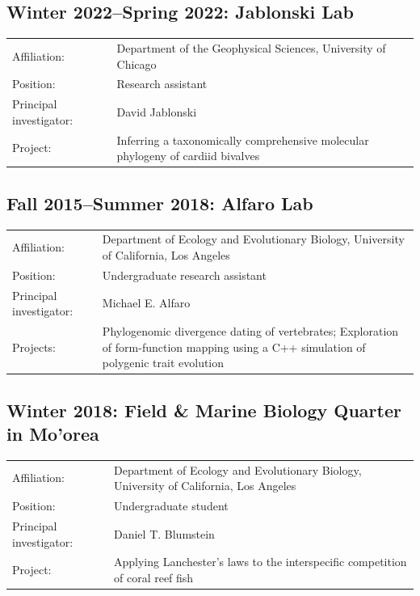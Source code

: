\documentclass[10pt]{article}
\begin{document}
\subsection*{Winter 2022--Spring 2022: Jablonski Lab}

\begin{tabularx}{\textwidth}{>{\raggedleft\arraybackslash}p{3.6cm} X}
Affiliation: & Department of the Geophysical Sciences, University of Chicago \\[0.1cm]
Position: & Research assistant \\[0.1cm]
Principal investigator: & David Jablonski \\[0.1cm]
Project: & Inferring a taxonomically comprehensive molecular phylogeny of cardiid bivalves
\end{tabularx}

\subsection*{Fall 2015--Summer 2018: Alfaro Lab}

\begin{tabularx}{\textwidth}{>{\raggedleft\arraybackslash}p{3.6cm} X}
Affiliation: & Department of Ecology and Evolutionary Biology, University of California, Los Angeles \\[0.1cm]
Position: & Undergraduate research assistant \\[0.1cm]
Principal investigator: & Michael E. Alfaro \\[0.1cm]
Projects: & Phylogenomic divergence dating of vertebrates; Exploration of form-function mapping using a \textsf{C++} simulation of polygenic trait evolution
\end{tabularx}

\subsection*{Winter 2018: Field \& Marine Biology Quarter in Mo'orea}

\begin{tabularx}{\textwidth}{>{\raggedleft\arraybackslash}p{3.6cm} X}
Affiliation: & Department of Ecology and Evolutionary Biology, University of California, Los Angeles \\[0.1cm]
Position: & Undergraduate student \\[0.1cm]
Principal investigator: & Daniel T. Blumstein \\[0.1cm]
Project: & Applying Lanchester's laws to the interspecific competition of coral reef fish
\end{tabularx}
\end{document}
